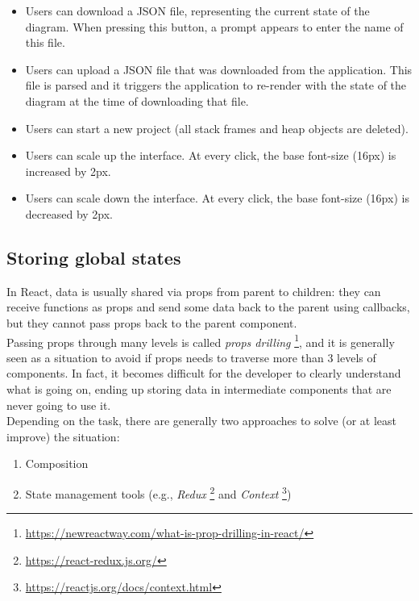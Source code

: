 \documentclass[]{usiinfbachelorproject}
\begin{document}
\begin{itemize}
	\item Users can download a JSON file, representing the current state of the diagram. When pressing this button, a prompt appears to enter the name of this file.
	\item Users can upload a JSON file that was downloaded from the application. This file is parsed and it triggers the application to re-render with the state of the diagram at the time of downloading that file.
	\item Users can start a new project (all stack frames and heap objects are deleted).
	\item Users can scale up the interface. At every click, the base font-size (16px) is increased by 2px.
	\item Users can scale down the interface. At every click, the base font-size (16px) is decreased by 2px.
\end{itemize}

\subsection{Storing global states} \label{storing states}

In React, data is usually shared via props from parent to children: they can receive functions as props and send some data back to the parent using callbacks, but they cannot pass props back to the parent component.\\ Passing props through many levels is called \emph{props drilling} \footnote{\url{https://newreactway.com/what-is-prop-drilling-in-react/}}, and it is generally seen as a situation to avoid if props needs to traverse more than 3 levels of components. In fact, it becomes difficult for the developer to clearly understand what is going on, ending up storing data in intermediate components that are never going to use it.\\

\noindent Depending on the task, there are generally two approaches to solve (or at least improve) the situation:

\begin{enumerate}
	\item Composition
	\item State management tools (e.g., \emph{Redux} \footnote{\url{https://react-redux.js.org/}} and \emph{Context} \footnote{\url{https://reactjs.org/docs/context.html}})
\end{enumerate}
\end{document}
